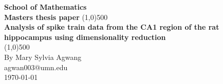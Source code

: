 


\begin{titlepage}
\begin{center}
\vspace*{1cm}  %
\Large{\textbf{School of Mathematics}}\\ %
\Large{\textbf{Masters thesis paper}} %
\vfill %
\line(1,0){500}\\[1mm]
\huge{\textbf{ Analysis of spike train data from the CA1 region of the rat  hippocampus using dimensionality reduction}}\\[3mm]
\line(1,0){500}\\
\vfill %
By Mary Sylvia Agwang\\
agwan003@umn.edu\\
\today %

\end{center}
\end{titlepage}



\newpage












